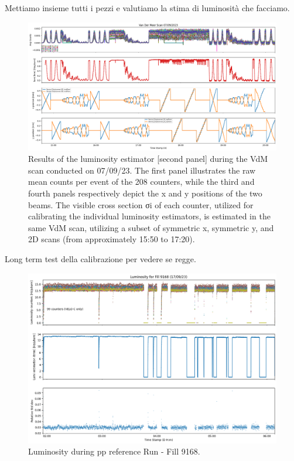 Mettiamo insieme tutti i pezzi e valutiamo la stima di luminosità che facciamo. 

\begin{figure}
    \centering
    \includegraphics[width=\textwidth]{figures/lumi_plot.png}
    \caption{Results of the luminosity estimator [second panel] during the VdM scan conducted on 07/09/23.
The first panel illustrates the raw mean counts per event of the 208 counters, while the third and fourth
panels respectively depict the x and y positions of the two beams. The visible cross section σi of each
counter, utilized for calibrating the individual luminosity estimators, is estimated in the same VdM scan,
utilizing a subset of symmetric x, symmetric y, and 2D scans (from approximately 15:50 to 17:20).}
    \label{fig:lumi_result_all}
\end{figure}


Long term test della calibrazione per vedere se regge. 

\begin{figure}
    \centering
    \includegraphics[width=\textwidth]{figures/fill9168.png}
    \caption{Luminosity during pp reference Run - Fill 9168.}
    \label{fig:fill9168}
\end{figure}